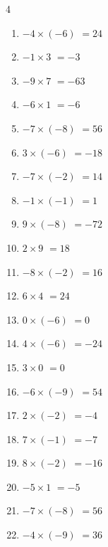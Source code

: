 \begin{multicols}{4}
\begin{enumerate}
  \item $-4\times (-6)$
        $=24$

  \item $-1\times 3$
        $=-3$

  \item $-9\times 7$
        $=-63$

  \item $-6\times 1$
        $=-6$

  \item $-7\times (-8)$
        $=56$

  \item $3\times (-6)$
        $=-18$

  \item $-7\times (-2)$
        $=14$

  \item $-1\times (-1)$
        $=1$

  \item $9\times (-8)$
        $=-72$

  \item $2\times 9$
        $=18$

  \item $-8\times (-2)$
        $=16$

  \item $6\times 4$
        $=24$

  \item $0\times (-6)$
        $=0$

  \item $4\times (-6)$
        $=-24$

  \item $3\times 0$
        $=0$

  \item $-6\times (-9)$
        $=54$

  \item $2\times (-2)$
        $=-4$

  \item $7\times (-1)$
        $=-7$

  \item $8\times (-2)$
        $=-16$

  \item $-5\times 1$
        $=-5$

\columnbreak %

  \item $-7\times (-8)$
        $=56$

  \item $-4\times (-9)$
        $=36$


\end{enumerate}
\end{multicols}
